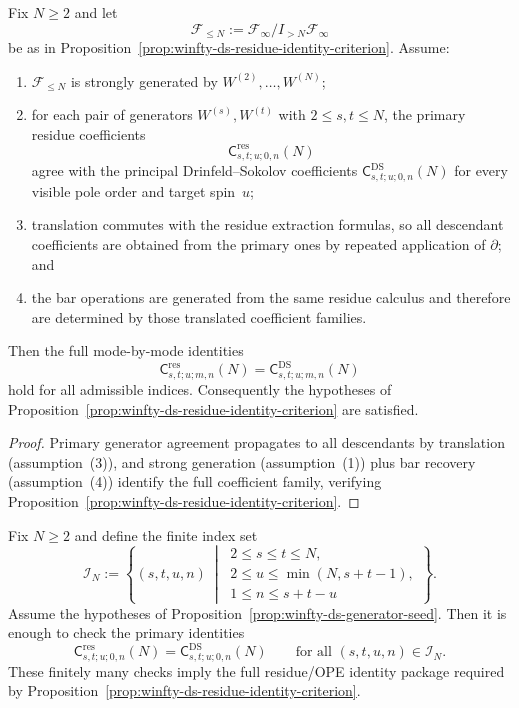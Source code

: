 \begin{proposition}
\label{prop:winfty-ds-generator-seed}
Fix $N \ge 2$ and let
\[
\mathcal{F}_{\le N}:=\mathcal{F}_\infty/I_{>N}\mathcal{F}_\infty
\]
be as in
Proposition~\ref{prop:winfty-ds-residue-identity-criterion}.  Assume:
\begin{enumerate}
\item $\mathcal{F}_{\le N}$ is strongly generated by
  $W^{(2)},\dots,W^{(N)}$;
\item for each pair of generators $W^{(s)},W^{(t)}$ with
  $2 \le s,t \le N$, the primary residue coefficients
  \[
  \mathsf{C}^{\mathrm{res}}_{s,t;u;0,n}(N)
  \]
  agree with the principal Drinfeld--Sokolov coefficients
  $\mathsf{C}^{\mathrm{DS}}_{s,t;u;0,n}(N)$ for every visible pole order
  and target spin~$u$;
\item translation commutes with the residue extraction formulas, so all
  descendant coefficients are obtained from the primary ones by
  repeated application of $\partial$; and
\item the bar operations are generated from the same residue calculus
  and therefore are determined by those translated coefficient
  families.
\end{enumerate}
Then the full mode-by-mode identities
\[
\mathsf{C}^{\mathrm{res}}_{s,t;u;m,n}(N)
=\mathsf{C}^{\mathrm{DS}}_{s,t;u;m,n}(N)
\]
hold for all admissible indices.  Consequently the hypotheses of
Proposition~\ref{prop:winfty-ds-residue-identity-criterion} are
satisfied.
\end{proposition}

\begin{proof}
Primary generator agreement propagates to all descendants by translation (assumption~(3)), and strong generation (assumption~(1)) plus bar recovery (assumption~(4)) identify the full coefficient family, verifying Proposition~\ref{prop:winfty-ds-residue-identity-criterion}.
\end{proof}

\begin{corollary}
\label{cor:winfty-ds-finite-seed-set}
Fix $N \ge 2$ and define the finite index set
\[
\mathcal{I}_N:=
\left\{
(s,t,u,n)\ \middle|\
\begin{array}{l}
2 \le s \le t \le N,\\
2 \le u \le \min(N,s+t-1),\\
1 \le n \le s+t-u
\end{array}
\right\}.
\]
Assume the hypotheses of
Proposition~\ref{prop:winfty-ds-generator-seed}.  Then it is enough to
check the primary identities
\[
\mathsf{C}^{\mathrm{res}}_{s,t;u;0,n}(N)
=\mathsf{C}^{\mathrm{DS}}_{s,t;u;0,n}(N)
\qquad\text{for all } (s,t,u,n)\in\mathcal{I}_N.
\]
These finitely many checks imply the full residue/OPE identity package
required by
Proposition~\ref{prop:winfty-ds-residue-identity-criterion}.
\end{corollary}

